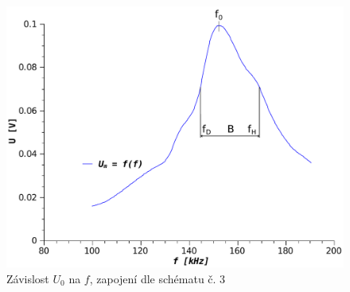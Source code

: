   \begin{figure}[H]
    \centering
    \includegraphics[width=13cm]{../img/g3.pdf}
    \caption{Závislost $U_0$ na $f$, zapojení dle schématu č. 3}
    \label{graf:3}
  \end{figure}
